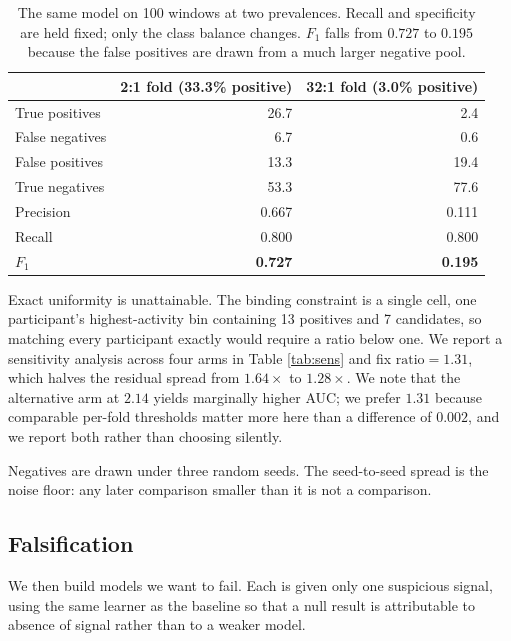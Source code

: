 \documentclass{article}
\begin{document}
\begin{table}[t]
\caption{The same model on 100 windows at two prevalences. Recall and
specificity are held fixed; only the class balance changes. $F_1$ falls from
$0.727$ to $0.195$ because the false positives are drawn from a much larger
negative pool.}
\label{tab:f1}
\centering
\begin{tabular}{lrr}
\toprule
 & 2:1 fold (33.3\% positive) & 32:1 fold (3.0\% positive) \\
\midrule
True positives  & 26.7 & 2.4 \\
False negatives &  6.7 & 0.6 \\
False positives & 13.3 & 19.4 \\
True negatives  & 53.3 & 77.6 \\
\midrule
Precision & 0.667 & 0.111 \\
Recall    & 0.800 & 0.800 \\
$F_1$     & \textbf{0.727} & \textbf{0.195} \\
\bottomrule
\end{tabular}
\end{table}

Exact uniformity is unattainable. The binding constraint is a single cell, one
participant's highest-activity bin containing 13 positives and 7 candidates, so
matching every participant exactly would require a ratio below one. We report a
sensitivity analysis across four arms in Table \ref{tab:sens} and fix
$\text{ratio} = 1.31$, which halves the residual spread from $1.64\times$ to
$1.28\times$. We note that the alternative arm at $2.14$ yields marginally
higher AUC; we prefer $1.31$ because comparable per-fold thresholds matter more
here than a difference of $0.002$, and we report both rather than choosing
silently.

Negatives are drawn under three random seeds. The seed-to-seed spread is the
noise floor: any later comparison smaller than it is not a comparison.

\subsection{Falsification}

We then build models we want to fail. Each is given only one suspicious signal,
using the same learner as the baseline so that a null result is attributable to
absence of signal rather than to a weaker model.
\end{document}
